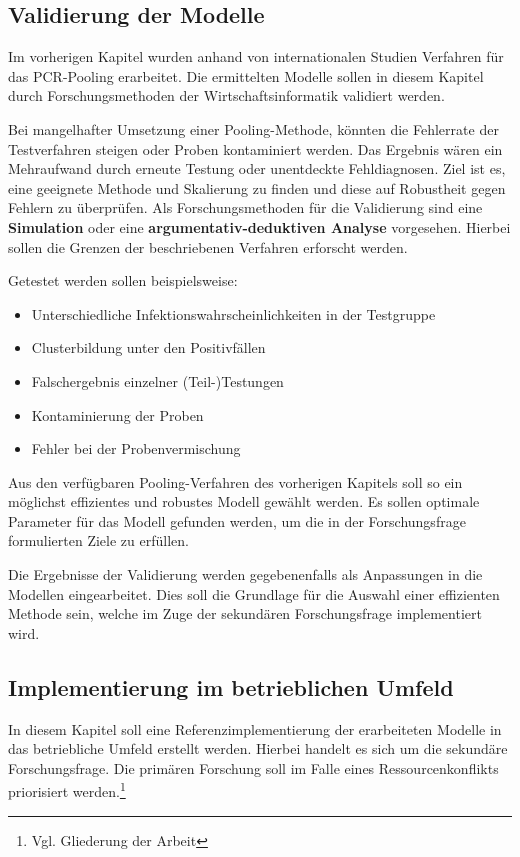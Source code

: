 \subsection{Validierung der Modelle}
Im vorherigen Kapitel wurden anhand von internationalen Studien Verfahren für das PCR-Pooling erarbeitet.
Die ermittelten Modelle sollen in diesem Kapitel durch Forschungsmethoden der Wirtschaftsinformatik validiert werden.

Bei mangelhafter Umsetzung einer Pooling-Methode, könnten die Fehlerrate der Testverfahren steigen oder Proben kontaminiert werden.
Das Ergebnis wären ein Mehraufwand durch erneute Testung oder unentdeckte Fehldiagnosen.
Ziel ist es, eine geeignete Methode und Skalierung zu finden und diese auf Robustheit gegen Fehlern zu überprüfen.
Als Forschungsmethoden für die Validierung sind eine \textbf{Simulation} oder eine \textbf{argumentativ-deduktiven Analyse} vorgesehen.
Hierbei sollen die Grenzen der beschriebenen Verfahren erforscht werden.

Getestet werden sollen beispielsweise:
\begin{itemize}
	\setlength{\itemsep}{-8pt}
	\item Unterschiedliche Infektionswahrscheinlichkeiten in der Testgruppe
	\item Clusterbildung unter den Positivfällen
	\item Falschergebnis einzelner (Teil-)Testungen
	\item Kontaminierung der Proben
	\item Fehler bei der Probenvermischung
\end{itemize}

Aus den verfügbaren Pooling-Verfahren des vorherigen Kapitels soll so ein möglichst effizientes und robustes Modell gewählt werden.
Es sollen optimale Parameter für das Modell gefunden werden, um die in der Forschungsfrage formulierten Ziele zu erfüllen.

Die Ergebnisse der Validierung werden gegebenenfalls als Anpassungen in die Modellen eingearbeitet.
Dies soll die Grundlage für die Auswahl einer effizienten Methode sein, welche im Zuge der sekundären Forschungsfrage implementiert wird.

\subsection{Implementierung im betrieblichen Umfeld}
In diesem Kapitel soll eine Referenzimplementierung der erarbeiteten Modelle in das betriebliche Umfeld erstellt werden.
Hierbei handelt es sich um die sekundäre Forschungsfrage.
Die primären Forschung soll im Falle eines Ressourcenkonflikts priorisiert werden.\footnote{Vgl. Gliederung der Arbeit}

